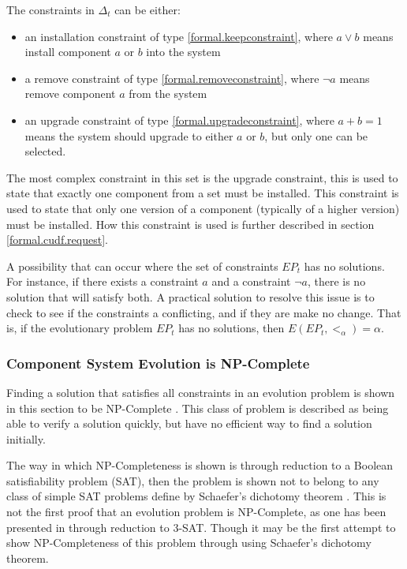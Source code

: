 The constraints in $\Delta_t$ can be either:
\begin{itemize}
  \item an installation constraint of type \ref{formal.keepconstraint}, where $a \vee b$ means install component $a$ or $b$ into the system
  \item a remove constraint of type \ref{formal.removeconstraint}, where $\neg a$ means remove component $a$ from the system
  \item an upgrade constraint of type \ref{formal.upgradeconstraint}, where $a + b = 1$ means the system should upgrade to either $a$ or $b$, but only one can be selected.
\end{itemize} 
The most complex constraint in this set is the upgrade constraint, this is used to state that exactly one component from a set must be installed.
This constraint is used to state that only one version of a component (typically of a higher version) must be installed.
How this constraint is used is further described in section \ref{formal.cudf.request}. 

A possibility that can occur where the set of constraints $EP_t$ has no solutions.
For instance, if there exists a constraint $a$ and a constraint $\neg a$, there is no solution that will satisfy both.   
A practical solution to resolve this issue is to check to see if the constraints a conflicting, and if they are make no change.
That is, if the evolutionary problem $EP_t$ has no solutions, then $E(EP_t,<_{\alpha}) = \alpha$.

\subsubsection{Component System Evolution is NP-Complete}
Finding a solution that satisfies all constraints in an evolution problem is shown in this section to be NP-Complete \citep{cook1971}.
This class of problem is described as being able to verify a solution quickly, but have no efficient way to find a solution initially.

The way in which NP-Completeness is shown is through reduction to a Boolean satisfiability problem (SAT),
then the problem is shown not to belong to any class of simple SAT problems define by Schaefer's dichotomy theorem \citep{Schaefer1978}.
This is not the first proof that an evolution problem is NP-Complete, as one has been presented in \citep{edos2005report} through reduction to 3-SAT. 
Though it may be the first attempt to show NP-Completeness of this problem through using Schaefer's dichotomy theorem.

